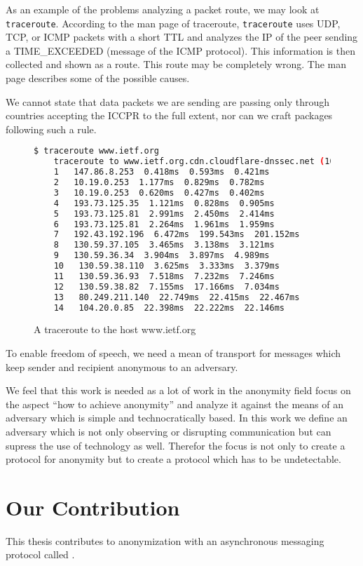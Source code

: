 As an example of the problems analyzing a packet route, we may look at \verb|traceroute|. According to the man page of traceroute, \verb|traceroute| uses UDP, TCP, or ICMP packets with a short TTL and analyzes the IP of the peer sending a TIME\_EXCEEDED (message of the ICMP protocol). This information is then collected and shown as a route. This route may be completely wrong. The man page describes some of the possible causes.

We cannot state that data packets we are sending are passing only through countries accepting the ICCPR to the full extent, nor can we craft packages following such a rule.

\begin{figure}[H]
	\begin{lstlisting}[language=bash,breaklines=true,basicstyle=\tiny]
	$ traceroute www.ietf.org
	traceroute to www.ietf.org.cdn.cloudflare-dnssec.net (104.20.0.85), 64 hops max
	1   147.86.8.253  0.418ms  0.593ms  0.421ms
	2   10.19.0.253  1.177ms  0.829ms  0.782ms
	3   10.19.0.253  0.620ms  0.427ms  0.402ms
	4   193.73.125.35  1.121ms  0.828ms  0.905ms
	5   193.73.125.81  2.991ms  2.450ms  2.414ms
	6   193.73.125.81  2.264ms  1.961ms  1.959ms
	7   192.43.192.196  6.472ms  199.543ms  201.152ms
	8   130.59.37.105  3.465ms  3.138ms  3.121ms
	9   130.59.36.34  3.904ms  3.897ms  4.989ms
	10   130.59.38.110  3.625ms  3.333ms  3.379ms
	11   130.59.36.93  7.518ms  7.232ms  7.246ms
	12   130.59.38.82  7.155ms  17.166ms  7.034ms
	13   80.249.211.140  22.749ms  22.415ms  22.467ms
	14   104.20.0.85  22.398ms  22.222ms  22.146ms
	\end{lstlisting}
	\caption{A traceroute to the host www.ietf.org}
\end{figure}

To enable freedom of speech, we need a mean of transport for messages which keep sender and recipient anonymous to an adversary.

We feel that this work is needed as a lot of work in the anonymity field focus on the aspect ``how to achieve anonymity'' and analyze it against the means of an adversary which is simple and technocratically based. In this work we define an adversary which is not only observing or disrupting communication but can supress the use of technology as well. Therefor the focus is not only to create a protocol for anonymity but to create a protocol which has to be undetectable.

\chapter{Our Contribution}
This thesis contributes to anonymization with an asynchronous messaging protocol called \MessageVortex.

